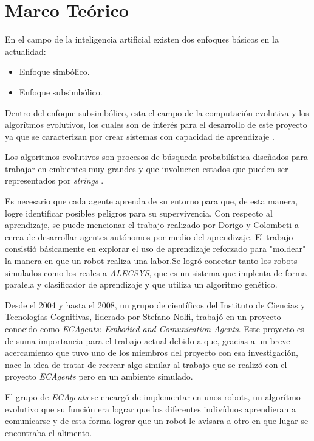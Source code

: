 \documentclass[times,10pt,twocolumn]{article}
\begin{document}
\section{Marco Teórico}

En el campo de la inteligencia artificial existen dos enfoques básicos en la actualidad:
\begin{itemize}
    \item Enfoque simbólico.
    \item Enfoque subsimbólico.
\end{itemize}
Dentro del enfoque subsimbólico, esta el campo de la computación evolutiva y los algorítmos evolutivos, los cuales son de interés para el desarrollo de este proyecto ya que se caracterizan por crear sistemas con capacidad de aprendizaje \citep{herran1998}.\par
Los algoritmos evolutivos son procesos de búsqueda probabilística diseñados para trabajar en embientes muy grandes y que involucren estados que pueden ser representados por \emph{strings} \citep{gordbergholland1988}. \par
Es necesario que cada agente aprenda de su entorno para que, de esta manera, logre identificar posibles peligros para su supervivencia. Con respecto al aprendizaje, se puede mencionar el trabajo realizado por Dorigo y Colombeti \citep{dorigocolombetti1994} a cerca de desarrollar agentes autónomos por medio del aprendizaje. El trabajo consistió básicamente en explorar el uso de aprendizaje reforzado para "moldear" la manera en que un robot realiza una labor.Se logró conectar tanto los robots simulados como los reales a \emph{ALECSYS}, que es un sistema que implenta de forma paralela y clasificador de aprendizaje y que utiliza un algoritmo genético.\par
Desde el 2004 y hasta el 2008, un grupo de científicos del Instituto de Ciencias y Tecnologías Cognitivas, liderado por Stefano Nolfi, trabajó en un proyecto conocido como \emph{ECAgents: Embodied and Comunication Agents}. Este proyecto es de suma importancia para el trabajo actual debido a que, gracias a un breve acercamiento que tuvo uno de los miembros del proyecto con esa investigación, nace la idea de tratar de recrear algo similar al trabajo que se realizó con el proyecto \emph{ECAgents} pero en un ambiente simulado.\par
El grupo de \emph{ECAgents} \citep{nolfi2004} se encargó de implementar en unos robots, un algorítmo evolutivo que su función era lograr que los diferentes indivíduos aprendieran a comunicarse y de esta forma lograr que un robot le avisara a otro en que lugar se encontraba el alimento.
\end{document}

